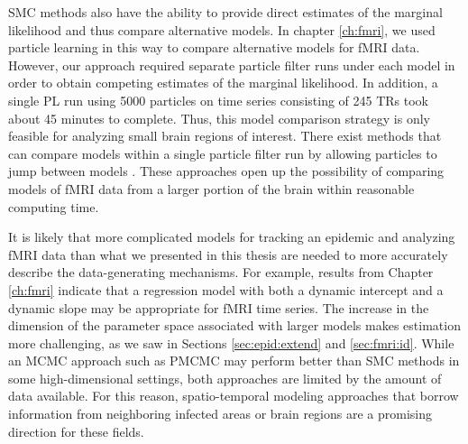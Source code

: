SMC methods also have the ability to provide direct estimates of the marginal likelihood and thus compare alternative models. In chapter \ref{ch:fmri}, we used particle learning in this way to compare alternative models for fMRI data. However, our approach required separate particle filter runs under each model in order to obtain competing estimates of the marginal likelihood. In addition, a single PL run using 5000 particles on time series consisting of 245 TRs took about 45 minutes to complete. Thus, this model comparison strategy is only feasible for analyzing small brain regions of interest. There exist methods that can compare models within a single particle filter run by allowing particles to jump between models \citep{berz:gilks:rmcross:2001,zhou:joh:smcmodcomp:2013}. These approaches open up the possibility of comparing models of fMRI data from a larger portion of the brain within reasonable computing time.

It is likely that more complicated models for tracking an epidemic \citep{Sham:Kars:pnas:2012, Bhad:Ioni:mala:2011} and analyzing fMRI data \citep{buxton:balloon:1998} than what we presented in this thesis are needed to more accurately describe the data-generating mechanisms. For example, results from Chapter \ref{ch:fmri} indicate that a regression model with both a dynamic intercept and a dynamic slope may be appropriate for fMRI time series. The increase in the dimension of the parameter space associated with larger models makes estimation more challenging, as we saw in Sections \ref{sec:epid:extend} and \ref{sec:fmri:id}. While an MCMC approach such as PMCMC may perform better than SMC methods in some high-dimensional settings, both approaches are limited by the amount of data available. For this reason, spatio-temporal modeling approaches that borrow information from neighboring infected areas or brain regions are a promising direction for these fields.